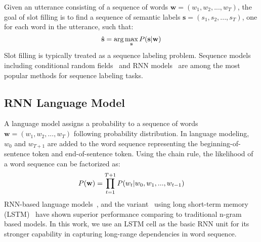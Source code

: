 \documentclass[11pt]{article}
\begin{document}
    Given an utterance consisting of a sequence of words $\mathbf{w}=(w_1, w_2, ..., w_T)$, the goal of slot filling is to find a sequence of semantic labels $\mathbf{s}=(s_1, s_2, ..., s_T)$, one for each word in the utterance, such that:
        \begin{equation}
            \hat{\mathbf{s}} = \operatorname{\arg\max_\mathbf{s}} P(\mathbf{s}|\mathbf{w}) \\
        \end{equation}
    Slot filling is typically treated as a sequence labeling problem. Sequence models including conditional random fields~\cite{raymond:07} and RNN models~\cite{yao:14,mesnil:15,liu:15} are among the most popular methods for sequence labeling tasks. 

\subsection{RNN Language Model}
    A language model assigns a probability to a sequence of words $\mathbf{w}=(w_1, w_2, ..., w_{T})$ following probability distribution. In language modeling, $w_0$ and $w_{T+1}$ are added to the word sequence representing the beginning-of-sentence token and end-of-sentence token. Using the chain rule, the likelihood of a word sequence can be factorized as:
        \begin{equation}
            P(\mathbf{w}) = \prod_{t=1}^{T+1}P(w_{t}|w_0, w_1, ..., w_{t-1}) \\
        \end{equation}
    RNN-based language models~\cite{mikolov:11}, and the variant~\cite{sundermeyer:12} using long short-term memory (LSTM)~\cite{hochreiter:97} have shown superior performance comparing to traditional n-gram based models. In this work, we use an LSTM cell as the basic RNN unit for its stronger capability in capturing long-range dependencies in word sequence. 
\end{document}
